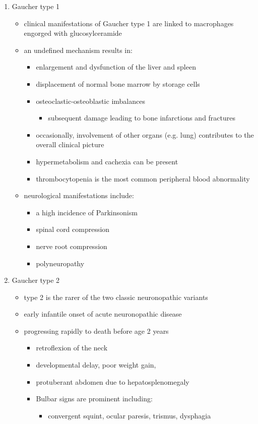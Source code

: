 \documentclass{scrartcl}
\begin{document}
\begin{enumerate}
\begin{enumerate}
\item Gaucher type 1
\label{sec:org4943bef}
\begin{itemize}
\item clinical manifestations of Gaucher type 1 are linked to macrophages
engorged with glucosylceramide

\item an undefined mechanism results in:
\begin{itemize}
\item enlargement and dysfunction of the liver and spleen
\item displacement of normal bone marrow by storage cells
\item osteoclastic-osteoblastic imbalances
\begin{itemize}
\item subsequent damage leading to bone infarctions and fractures
\end{itemize}
\item occasionally, involvement of other organs (e.g. lung) contributes
to the overall clinical picture
\item hypermetabolism and cachexia can be present
\item thrombocytopenia is the most common peripheral blood abnormality
\end{itemize}

\item neurological manifestations include:
\begin{itemize}
\item a high incidence of Parkinsonism
\item spinal cord compression
\item nerve root compression
\item polyneuropathy
\end{itemize}
\end{itemize}

\item Gaucher type 2
\label{sec:org165dda6}
\begin{itemize}
\item type 2 is the rarer of the two classic neuronopathic variants
\item early infantile onset of acute neuronopathic disease
\item progressing rapidly to death before age 2 years

\begin{itemize}
\item retroflexion of the neck
\item developmental delay, poor weight gain,
\item protuberant abdomen due to hepatosplenomegaly
\item Bulbar signs are prominent including:
\begin{itemize}
\item convergent squint, ocular paresis, trismus, dysphagia
\end{itemize}
\end{itemize}


\end{itemize}
\end{enumerate}
\end{enumerate}
\end{document}
